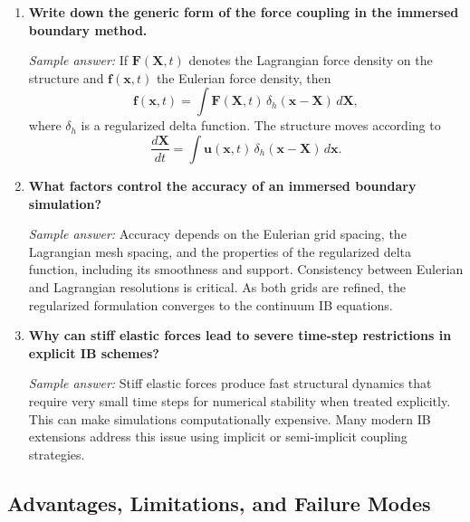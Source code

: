 \documentclass[12pt]{article}
\begin{document}
\begin{enumerate}[resume]
\item \textbf{Write down the generic form of the force coupling in the immersed boundary method.}

\textit{Sample answer:}
If $\mathbf{F}(\mathbf{X},t)$ denotes the Lagrangian force density on the structure and $\mathbf{f}(\mathbf{x},t)$ the Eulerian force density, then
\[
\mathbf{f}(\mathbf{x},t) = \int \mathbf{F}(\mathbf{X},t)\,\delta_h(\mathbf{x}-\mathbf{X})\,d\mathbf{X},
\]
where $\delta_h$ is a regularized delta function. The structure moves according to
\[
\frac{d\mathbf{X}}{dt} = \int \mathbf{u}(\mathbf{x},t)\,\delta_h(\mathbf{x}-\mathbf{X})\,d\mathbf{x}.
\]

\item \textbf{What factors control the accuracy of an immersed boundary simulation?}

\textit{Sample answer:}
Accuracy depends on the Eulerian grid spacing, the Lagrangian mesh spacing, and the properties of the regularized delta function, including its smoothness and support. Consistency between Eulerian and Lagrangian resolutions is critical. As both grids are refined, the regularized formulation converges to the continuum IB equations.

\item \textbf{Why can stiff elastic forces lead to severe time-step restrictions in explicit IB schemes?}

\textit{Sample answer:}
Stiff elastic forces produce fast structural dynamics that require very small time steps for numerical stability when treated explicitly. This can make simulations computationally expensive. Many modern IB extensions address this issue using implicit or semi-implicit coupling strategies.
\end{enumerate}

\subsection*{Advantages, Limitations, and Failure Modes}
\end{document}
